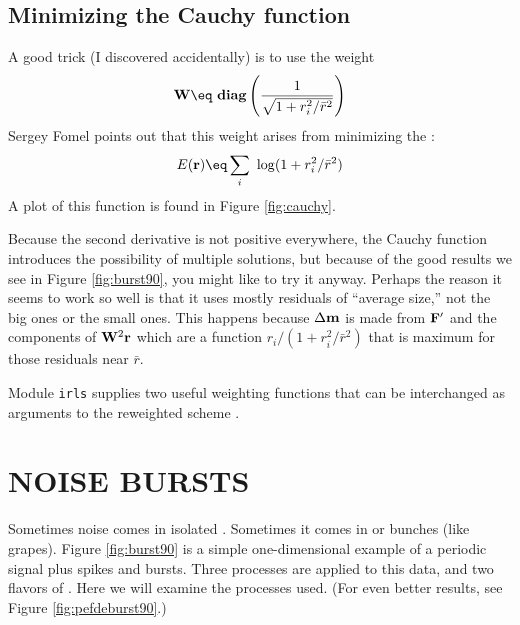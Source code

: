 \subsection{Minimizing the Cauchy function}
A good trick
(I discovered accidentally) is to use the weight
\begin{equation}
\bold W \eq \ {\bf diag} \left(  {1\over{\sqrt{1+r_i^2/\bar r^2}}}  \right)
\label{eqn:cauchyweight}
\end{equation}
Sergey Fomel points out that this weight arises from
minimizing the :
\begin{equation}
E(\bold r) \eq \sum_i \ \log (1+r_i^2/\bar r^2)
\label{eqn:cauchypenalty}
\end{equation}
A plot of this function is found in Figure \ref{fig:cauchy}.

\par
Because the second derivative is not positive everywhere,
the Cauchy function introduces the possibility of multiple solutions,
but because of the good results we see in Figure \ref{fig:burst90},
you might like to try it anyway.
Perhaps the reason it seems to work so well is that
it uses mostly residuals of ``average size,''
not the big ones or the small ones.
This happens because $\Delta\bold m$ is made from $\bold F'$ and
the components of $\bold W^2\bold r$  which are a function
$r_i/(1+r_i^2/\bar r^2)$
that is maximum for those residuals near
$\bar r$.
\par
Module \texttt{irls}  supplies two useful
weighting functions that can be interchanged as arguments to the
reweighted scheme .



\section{NOISE BURSTS}
Sometimes noise comes in isolated .
Sometimes it comes in  or bunches (like grapes).
Figure \ref{fig:burst90} is a simple one-dimensional example
of a periodic signal plus spikes and bursts.
Three processes are applied to this data,
 and two flavors of .
Here we will examine the processes used.
(For even better results, see Figure \ref{fig:pefdeburst90}.)

